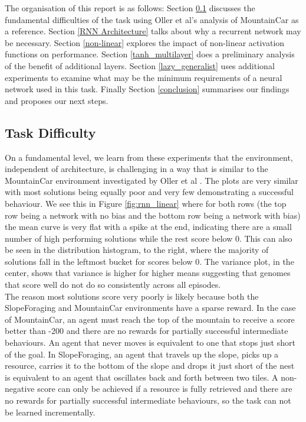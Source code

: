 \documentclass[12pt]{article}
\begin{document}
The organisation of this report is as follows: 
Section \ref{task_difficulty} discusses the fundamental difficulties of the task using Oller et al's analysis of MountainCar \cite{MountainCar} as a reference. 
Section \ref{RNN Architecture} talks about why a recurrent network may be necessary. 
Section \ref{non-linear} explores the impact of non-linear activation functions on performance. 
Section \ref{tanh_multilayer} does a preliminary analysis of the benefit of additional layers. 
Section \ref{lazy_generalist} uses additional experiments to examine what may be the minimum requirements of a neural network used in this task. 
Finally Section \ref{conclusion} summarises our findings and proposes our next steps. \\ 

\subsection{Task Difficulty} \label{task_difficulty}

On a fundamental level, we learn from these experiments that the environment, independent of architecture, is challenging in a way that is similar to the MountainCar environment  \cite{MountainCar} investigated by Oller et al \cite{oller:AAMAS:2020}. 
The plots are very similar with most solutions being equally poor and very few demonstrating a successful behaviour. 
We see this in Figure \ref{fig:rnn_linear} where for both rows (the top row being a network with no bias and the bottom row being a network with bias) the mean curve is very flat with a spike at the end, indicating there are a small number of high performing solutions while the rest score below 0.
This can also be seen in the distribution histogram, to the right, where the majority of solutions fall in the leftmost bucket for scores below 0. 
The variance plot, in the center, shows that variance is higher for higher means suggesting that genomes that score well do not do so consistently across all episodes.\\

The reason most solutions score very poorly is likely because both the SlopeForaging and MountainCar environments have a sparse reward. 
In the case of MountainCar, an agent must reach the top of the mountain to receive a score better than -200 and there are no rewards for partially successful intermediate behaviours. 
An agent that never moves is equivalent to one that stops just short of the goal. 
In SlopeForaging, an agent that travels up the slope, picks up a resource, carries it to the bottom of the slope and drops it just short of the nest is equivalent to an agent that oscillates back and forth between two tiles. 
A non-negative score can only be achieved if a resource is fully retrieved and there are no rewards for partially successful intermediate behaviours, so the task can not be learned incrementally.\\
\end{document}
